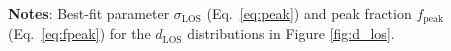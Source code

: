 \begin{table}
                                                                                                                                                                                                                                                                    {\bf Notes}: Best-fit parameter $\sigma_\mathrm{LOS}$ (Eq.~\ref{eq:peak}) and peak fraction $f_{\mathrm{peak}}$ (Eq.~\ref{eq:fpeak}) for the $d_{\mathrm{LOS}}$ distributions in Figure \ref{fig:d_los}. 
                                                                                                                                                                                                                                                                    \smallskip
                                                                                                                                                                                                                                                                    \end{table}

